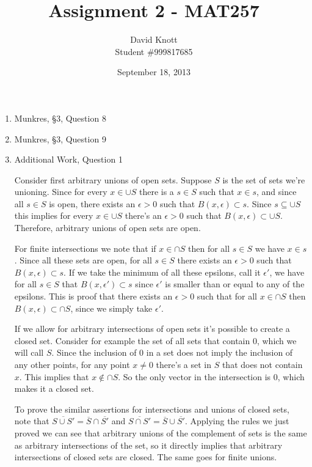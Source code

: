 \documentclass[letterpaper,10pt]{article}
\begin{document}
\title{Assignment 2 - MAT257}
\author{David Knott \\  Student \#999817685}
\date{September 18, 2013}
\maketitle
\begin{enumerate}
	\item Munkres, \S3, Question 8

	\item Munkres, \S3, Question 9
	\item Additional Work, Question 1

	Consider first arbitrary unions of open sets. Suppose $S$ is the set of sets we're unioning. Since for every $x \in \cup S$ there is a $s \in S$ such that $x \in s$, and since all $s \in S$ is open, there exists an $\epsilon > 0$ such that $B(x, \epsilon) \subset s$. Since $s \subseteq \cup S$ this implies for every $x \in \cup S$ there's an $\epsilon > 0$ such that $B(x, \epsilon) \subset \cup S$. Therefore, arbitrary unions of open sets are open.

	For finite intersections we note that if $x \in \cap S$ then for all $s \in S$ we have $x \in s$. Since all these sets are open, for all $s \in S$ there exists an $\epsilon > 0$ such that $B(x, \epsilon) \subset s$. If we take the minimum of all these epsilons, call it $\epsilon'$, we have for all $s \in S$ that $B(x, \epsilon') \subset s$ since $\epsilon'$ is smaller than or equal to any of the epsilons. This is proof that there exists an $\epsilon > 0$ such that for all $x \in \cap S$ then $B(x, \epsilon) \subset \cap S$, since we simply take $\epsilon '$.

	If we allow for arbitrary intersections of open sets it's possible to create a closed set. Consider for example the set of all sets that contain $0$, which we will call $S$. Since the inclusion of $0$ in a set does not imply the inclusion of any other points, for any point $x \neq 0$ there's a set in $S$ that does not contain $x$. This implies that $x \notin \cap S$. So the only vector in the intersection is $0$, which makes it a closed set.

	To prove the similar assertions for intersections and unions of closed sets, note that $\overline{S \cup S'} = \overline{S} \cap \overline{S'}$ and $\overline{S \cap S'} = \overline{S} \cup \overline{S'}$. Applying the rules we just proved we can see that arbitrary unions of the complement of sets is the same as arbitrary intersections of the set, so it directly implies that arbitrary intersections of closed sets are closed. The same goes for finite unions.


\end{enumerate}
\end{document}
